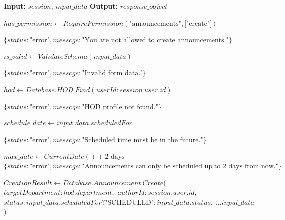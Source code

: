 \begin{algorithm}[H]
\caption{HOD Announcement Creation Process}
\begin{algorithmic}[1]

\State \textbf{Input:} $session$, $input\_data$
\State \textbf{Output:} $response\_object$


    \State {}
    \State $has\_permission \gets RequirePermission(\text{"announcements"}, \text{["create"]})$

        \State \Return $\{status: \text{"error"}, message: \text{"You are not allowed to create announcements."}\}$
    \EndIf

    \State {}
    \State $is\_valid \gets ValidateSchema(input\_data)$

        \State \Return $\{status: \text{"error"}, message: \text{"Invalid form data."}\}$
    \EndIf

    \State {}
    \State $hod \gets Database.HOD.Find(userId: session.user.id)$

        \State \Return $\{status: \text{"error"}, message: \text{"HOD profile not found."}\}$
    \EndIf

    \State {}
        \State $schedule\_date \gets input\_data.scheduledFor$

            \State \Return $\{status: \text{"error"}, message: \text{"Scheduled time must be in the future."}\}$
        \EndIf

        \State $max\_date \gets CurrentDate() + 2 \text{ days}$
            \State \Return $\{status: \text{"error"}, message: \text{"Announcements can only be scheduled up to 2 days from now."}\}$
        \EndIf
    \EndIf

    \State {}
    \State $CreationResult \gets Database.Announcement.Create($
    \State \quad $targetDepartment: hod.department,$
    \State \quad $authorId: session.user.id,$
    \State \quad $status: input\_data.scheduledFor ? \text{"SCHEDULED"} : input\_data.status,$
    \State \quad $...input\_data$
    \State $)$


\end{algorithmic}
\end{algorithm}
